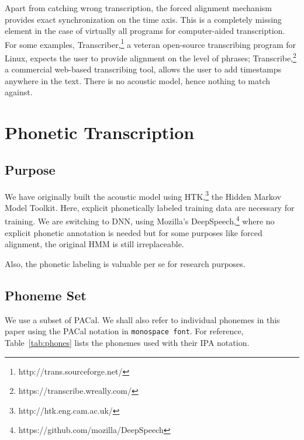 \documentclass{itatnew}
\begin{document}
Apart from catching wrong transcription, the forced alignment mechanism provides
exact synchronization on the time axis. This is a completely missing element in
the case of virtually all programs for computer-aided transcription. For some
examples, Transcriber,\footnote{http://trans.sourceforge.net/} a veteran
open-source transcribing program for Linux, expects the user to provide
alignment on the level of phrases;
Transcribe,\footnote{https://transcribe.wreally.com/} a commercial web-based
transcribing tool, allows the user to add timestamps anywhere in the text. There
is no acoustic model, hence nothing to match against.

\section{Phonetic Transcription}

\subsection{Purpose}

We have originally built the acoustic model using
HTK,\footnote{http://htk.eng.cam.ac.uk/} the Hidden Markov Model Toolkit. Here,
explicit phonetically labeled training data are necessary for training. We are
switching to DNN, using Mozilla's
DeepSpeech,\footnote{https://github.com/mozilla/DeepSpeech} where no explicit
phonetic annotation is needed but for some purposes like forced alignment, the
original HMM is still irreplaceable.

Also, the phonetic labeling is valuable per se for research purposes.

\subsection{Phoneme Set}

We use a subset of PACal\cite{nouza1997phonetic}. We shall also refer to
individual phonemes in this paper using the PACal notation in \texttt{monospace
font}. For reference, Table~\ref{tab:phones} lists the phonemes used with their
IPA notation.
\end{document}
